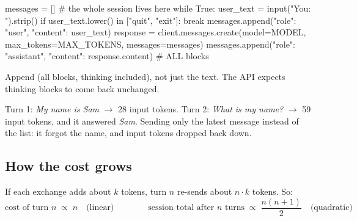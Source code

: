 \begin{pycode}
messages = []                                   # the whole session lives here
while True:
    user_text = input("You: ").strip()
    if user_text.lower() in ["quit", "exit"]:
        break
    messages.append({"role": "user", "content": user_text})
    response = client.messages.create(model=MODEL, max_tokens=MAX_TOKENS, messages=messages)
    messages.append({"role": "assistant", "content": response.content})   # ALL blocks
\end{pycode}

\begin{gamerule}
Append  (all blocks, thinking included), not just the text. The API expects
thinking blocks to come back unchanged.
\end{gamerule}

\begin{lab}
Turn 1: \emph{My name is Sam} $\to$ 28 input tokens. Turn 2: \emph{What is my name?} $\to$ 59 input
tokens, and it answered \emph{Sam}. Sending only the latest message instead of the list: it forgot the
name, and input tokens dropped back down.
\end{lab}

\subsection{How the cost grows}

If each exchange adds about $k$ tokens, turn $n$ re-sends about $n\cdot k$ tokens. So:
\[
\text{cost of turn } n \;\propto\; n \quad\text{(linear)}
\qquad\qquad
\text{session total after } n \text{ turns} \;\propto\; \frac{n(n+1)}{2} \quad\text{(quadratic)}
\]

\begin{center}
\end{center}

